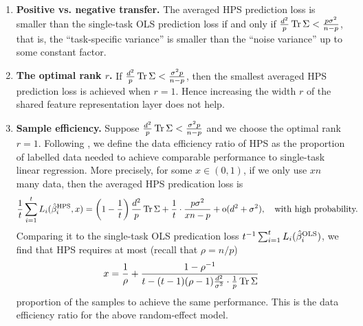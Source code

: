 {\begin{example}
\begin{enumerate}
	\item {\bf Positive vs. negative transfer.} The averaged HPS prediction loss is smaller than the single-task OLS prediction loss if and only if $\frac{d^2}{p}\operatorname{Tr} \Sigma  < \frac{p\sigma^2 }{n - p}$, that is, the ``task-specific variance'' is smaller than the ``noise variance'' up to some constant factor.

	\item {\bf The optimal rank $r$.} If $\frac{d^2}{p}\operatorname{Tr} \Sigma  < \frac{\sigma^2 p}{n - p}$, then the smallest averaged HPS  prediction loss is achieved when $r=1$. Hence increasing the width $r$ of the shared feature representation layer does not help.


	\item {\bf Sample efficiency.} Suppose $\frac{d^2}{p}\operatorname{Tr} \Sigma  < \frac{\sigma^2 p}{n - p}$ and we choose the optimal rank $r=1$. Following , we define the data efficiency ratio of HPS as the proportion of labelled data needed to achieve comparable performance to single-task linear regression. More precisely, for some $x\in (0,1)$, if we only use $xn$ many data, then the averaged HPS predication loss is
	\[ \frac{1}{t} \sum_{i=1}^t L_i(\hat{\beta}_i^{\textup{HPS}},x) = \left({1 - \frac{1}{t}}\right) \frac{d^2}{p}\operatorname{Tr} \Sigma  + \frac{1}{t} \cdot \frac{p\sigma^2 }{xn - p}+\operatorname{o}(d^2 + \sigma^2) ,\quad \text{with high probability. }\]
	Comparing it to the single-task OLS predication loss $t^{-1} \sum_{i=1}^t L_i(\hat{\beta}_i^{\textup{OLS}})$, we find that HPS requires at most (recall that $\rho=n/p$)
	$$x= \frac{1}{\rho} + \frac{1 - \rho^{-1}}{t - (t - 1)(\rho-1)\frac{d^2 }{\sigma^2 } \cdot \frac1p\operatorname{Tr}\Sigma}$$
	proportion of the samples to achieve the same performance. This is the data efficiency ratio for the above random-effect model.

	\end{enumerate}


\end{example}}
